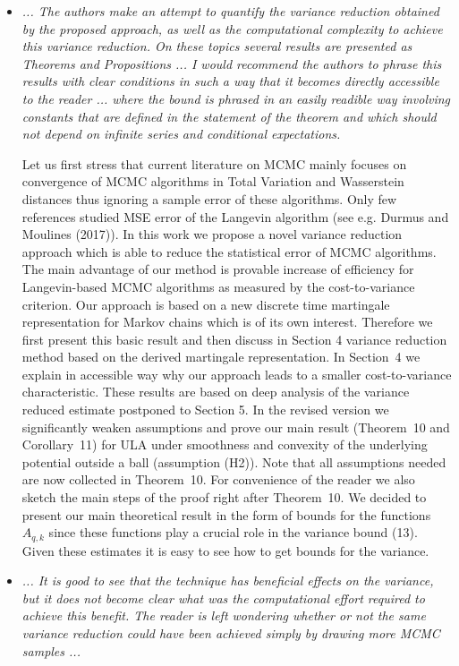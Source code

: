 \documentclass{article}%
\begin{document}
\begin{itemize}

\item \textit{... The authors make an attempt to quantify the variance reduction obtained by the proposed approach, as well as the computational complexity to achieve this variance reduction. On these topics several results are presented as Theorems and Propositions  ... I would recommend the authors to phrase this results with clear conditions in such a way that it becomes directly accessible to the reader ... where the bound is phrased in an easily readible way involving constants that are defined in the statement of the theorem and which should not depend on infinite series and conditional expectations.}
\par
Let us first stress that  current literature on MCMC  mainly focuses on  convergence of MCMC algorithms in Total Variation and Wasserstein distances thus  ignoring a sample error of these algorithms. Only few references studied MSE error of the Langevin algorithm (see e.g.  Durmus and  Moulines (2017)). In this work we propose a novel variance reduction approach which is able to reduce the statistical error of MCMC algorithms. The main advantage of our method is provable increase of efficiency for Langevin-based MCMC algorithms as measured by  the cost-to-variance criterion. Our approach is based on a new discrete time martingale representation for Markov chains which is of its own interest. Therefore we first present this basic result and then discuss in Section 4 variance reduction method based on the derived martingale representation. In  Section~4 we  explain in accessible way why our approach leads to a smaller cost-to-variance characteristic. These results are based on deep analysis of the variance reduced estimate postponed to Section 5. In the revised version we significantly weaken  assumptions  and prove our main result (Theorem~10 and Corollary~11) for ULA under smoothness  and convexity of the underlying potential outside a ball (assumption  (H2)).   Note that all assumptions needed are now collected in Theorem~10. For convenience of the reader we also sketch the main steps of the proof right after 
Theorem~10. We decided to present our main theoretical result in the form of bounds for the functions $A_{q,k}$ since these functions play a crucial role in the variance bound (13). Given these estimates it is easy to see how to get bounds for the variance. 
\item \textit{... It is good to see that the technique has beneficial effects on the variance, but it does not become clear what was the computational effort required to achieve this benefit. The reader is left wondering whether or not the same variance reduction could have been achieved simply by drawing more MCMC samples ...}

\end{itemize}
\end{document}
